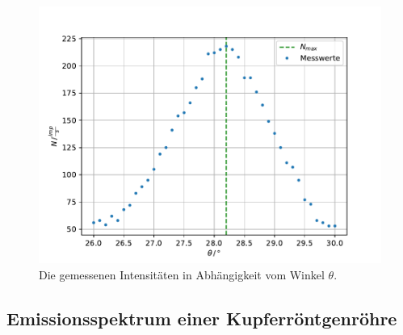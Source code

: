 \begin{figure}
    \centering
    \includegraphics[width=\textwidth]{content/data/absorption1.pdf}
    \caption{Die gemessenen Intensitäten in Abhängigkeit vom Winkel $\theta$.}
    \label{fig:bragg}
\end{figure}

\FloatBarrier

\subsection{Emissionsspektrum einer Kupferröntgenröhre}


